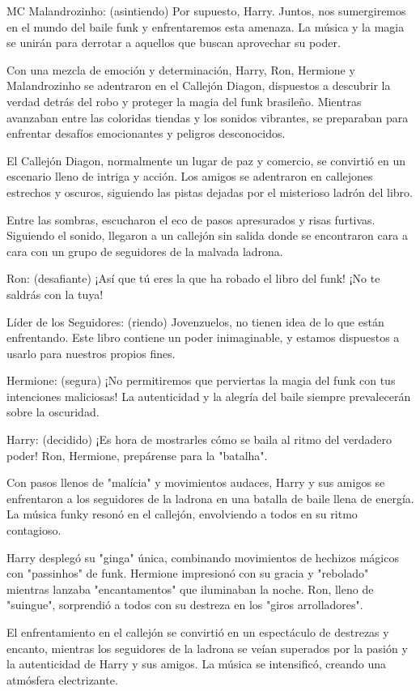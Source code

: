 MC Malandrozinho: (asintiendo) Por supuesto, Harry. Juntos, nos sumergiremos en el mundo del baile funk y enfrentaremos esta amenaza. La música y la magia se unirán para derrotar a aquellos que buscan aprovechar su poder.

Con una mezcla de emoción y determinación, Harry, Ron, Hermione y Malandrozinho se adentraron en el Callejón Diagon, dispuestos a descubrir la verdad detrás del robo y proteger la magia del funk brasileño. Mientras avanzaban entre las coloridas tiendas y los sonidos vibrantes, se preparaban para enfrentar desafíos emocionantes y peligros desconocidos.

El Callejón Diagon, normalmente un lugar de paz y comercio, se convirtió en un escenario lleno de intriga y acción. Los amigos se adentraron en callejones estrechos y oscuros, siguiendo las pistas dejadas por el misterioso ladrón del libro.

Entre las sombras, escucharon el eco de pasos apresurados y risas furtivas. Siguiendo el sonido, llegaron a un callejón sin salida donde se encontraron cara a cara con un grupo de seguidores de la malvada ladrona.

Ron: (desafiante) ¡Así que tú eres la que ha robado el libro del funk! ¡No te saldrás con la tuya!

Líder de los Seguidores: (riendo) Jovenzuelos, no tienen idea de lo que están enfrentando. Este libro contiene un poder inimaginable, y estamos dispuestos a usarlo para nuestros propios fines.

Hermione: (segura) ¡No permitiremos que perviertas la magia del funk con tus intenciones maliciosas! La autenticidad y la alegría del baile siempre prevalecerán sobre la oscuridad.

Harry: (decidido) ¡Es hora de mostrarles cómo se baila al ritmo del verdadero poder! Ron, Hermione, prepárense para la "batalha".

Con pasos llenos de "malícia" y movimientos audaces, Harry y sus amigos se enfrentaron a los seguidores de la ladrona en una batalla de baile llena de energía. La música funky resonó en el callejón, envolviendo a todos en su ritmo contagioso.

Harry desplegó su "ginga" única, combinando movimientos de hechizos mágicos con "passinhos" de funk. Hermione impresionó con su gracia y "rebolado" mientras lanzaba "encantamentos" que iluminaban la noche. Ron, lleno de "suingue", sorprendió a todos con su destreza en los "giros arrolladores".

El enfrentamiento en el callejón se convirtió en un espectáculo de destrezas y encanto, mientras los seguidores de la ladrona se veían superados por la pasión y la autenticidad de Harry y sus amigos. La música se intensificó, creando una atmósfera electrizante.

